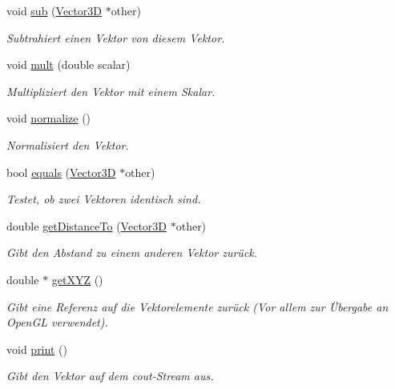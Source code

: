 \begin{DoxyCompactItemize}
void \hyperlink{classVector3D_a02364a41693ac080f5adadd776df74b4}{sub} (\hyperlink{classVector3D}{Vector3\-D} $\ast$other)
\begin{DoxyCompactList}\small\item\em Subtrahiert einen Vektor von diesem Vektor. \end{DoxyCompactList}\item 
void \hyperlink{classVector3D_a3dec11494c99de7370e3877054c3ef13}{mult} (double scalar)
\begin{DoxyCompactList}\small\item\em Multipliziert den Vektor mit einem Skalar. \end{DoxyCompactList}\item 
void \hyperlink{classVector3D_abfb12ecb9c9beb88e095cc4a1a512d3c}{normalize} ()
\begin{DoxyCompactList}\small\item\em Normalisiert den Vektor. \end{DoxyCompactList}\item 
bool \hyperlink{classVector3D_ac83e936757114f32bc9d868ea5fabbc2}{equals} (\hyperlink{classVector3D}{Vector3\-D} $\ast$other)
\begin{DoxyCompactList}\small\item\em Testet, ob zwei Vektoren identisch sind. \end{DoxyCompactList}\item 
double \hyperlink{classVector3D_a42deb992ec2f44abfb5824ea4917135c}{get\-Distance\-To} (\hyperlink{classVector3D}{Vector3\-D} $\ast$other)
\begin{DoxyCompactList}\small\item\em Gibt den Abstand zu einem anderen Vektor zurück. \end{DoxyCompactList}\item 
double $\ast$ \hyperlink{classVector3D_a89aeff2092d6a954cd449aca97c59197}{get\-X\-Y\-Z} ()
\begin{DoxyCompactList}\small\item\em Gibt eine Referenz auf die Vektorelemente zurück (Vor allem zur Übergabe an Open\-G\-L verwendet). \end{DoxyCompactList}\item 
void \hyperlink{classVector3D_a37762d009e092a9a9eecb2de03b6f0ec}{print} ()
\begin{DoxyCompactList}\small\item\em Gibt den Vektor auf dem cout-\/\-Stream aus. \end{DoxyCompactList}\item 

\end{DoxyCompactItemize}
